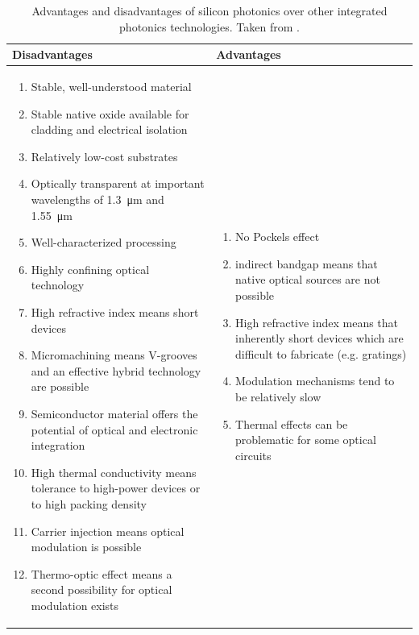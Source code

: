 \begin{table}[!htbp]
	\centering
	\footnotesize
	\begin{tabular}{p{} p{}}
	\toprule
	\normalsize Disadvantages & \normalsize Advantages \\ 
	\midrule
	\begin{enumerate}[ label={\roman*.}, noitemsep ]
		\item Stable, well-understood material
		\item Stable native oxide available for cladding and electrical isolation
		\item Relatively low-cost substrates
		\item Optically transparent at important wavelengths of \SI{1.3}{\um} and \SI{1.55}{\um}
		\item Well-characterized processing
		\item Highly confining optical technology
		\item High refractive index means short devices
		\item Micromachining means V-grooves and an effective hybrid technology are possible
		\item Semiconductor material offers the potential of optical and electronic integration
		\item High thermal conductivity means tolerance to high-power devices or to high packing density
		\item Carrier injection means optical modulation is possible
		\item Thermo-optic effect means a second possibility for optical modulation exists
	\end{enumerate}
	&
	\begin{enumerate}[ label={\roman*.}, noitemsep]
		\item No Pockels effect
		\item indirect bandgap means that native optical sources are not possible
		\item High refractive index means that inherently short devices which are difficult to fabricate (e.g. gratings)
		\item Modulation mechanisms tend to be relatively slow
		\item Thermal effects can be problematic for some optical circuits
	\end{enumerate}
	\\	
	\bottomrule
	\end{tabular}
	
	\caption{Advantages and disadvantages of silicon photonics over other integrated photonics technologies. Taken from \cite{Reed2004}.}
	\label{tab:silicon_adv_and_disadv}
\end{table}

